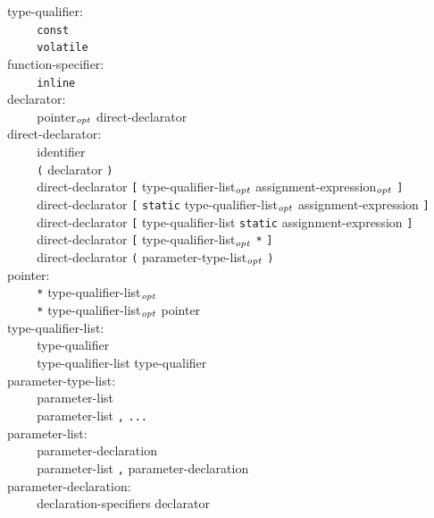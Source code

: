\documentclass[12pt]{report}
\def\|{\verb|}
\newcommand\opt{$_{{\it opt}}$ }
\begin{document}
\noindent
type-qualifier:\\
\|    | \verb+const+\\
\|    | \verb+volatile+\\

\noindent
function-specifier:\\
\|    | \verb+inline+\\

\noindent
declarator:\\
\|    | pointer\opt direct-declarator\\

\noindent
direct-declarator:\\
\|    | identifier\\
\|    | \verb+(+ declarator \verb+)+\\
\|    | direct-declarator \verb+[+ type-qualifier-list\opt assignment-expression\opt \verb+]+\\
\|    | direct-declarator \verb+[+ \verb+static+ type-qualifier-list\opt assignment-expression \verb+]+\\
\|    | direct-declarator \verb+[+ type-qualifier-list \verb+static+ assignment-expression \verb+]+\\
\|    | direct-declarator \verb+[+ type-qualifier-list\opt \verb+*+ \verb+]+\\
\|    | direct-declarator \verb+(+ parameter-type-list\opt \verb+)+\\

\noindent
pointer:\\
\|    | \verb+*+ type-qualifier-list\opt\\
\|    | \verb+*+ type-qualifier-list\opt pointer\\

\noindent
type-qualifier-list:\\
\|    | type-qualifier\\
\|    | type-qualifier-list type-qualifier\\

\noindent
parameter-type-list:\\
\|    | parameter-list\\
\|    | parameter-list \verb+,+ \verb+...+\\

\noindent
parameter-list:\\
\|    | parameter-declaration\\
\|    | parameter-list \verb+,+ parameter-declaration\\

\noindent
parameter-declaration:\\
\|    | declaration-specifiers declarator\\
\end{document}
